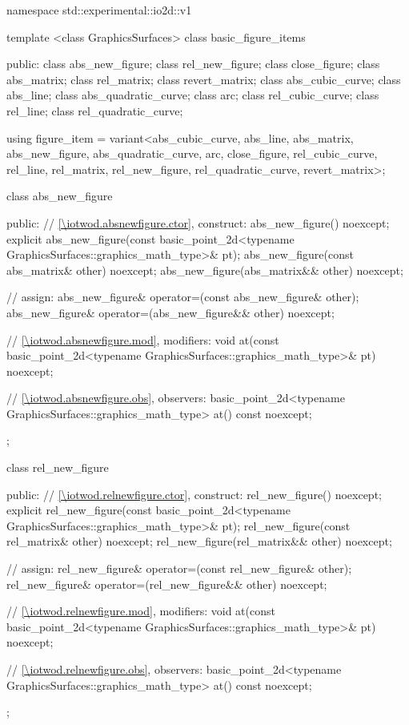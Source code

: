 \begin{codeblock}
namespace std::experimental::io2d::v1 {
  template <class GraphicsSurfaces>
  class basic_figure_items {
  public:
    class abs_new_figure;
    class rel_new_figure;
    class close_figure;
    class abs_matrix;
    class rel_matrix;
    class revert_matrix;
    class abs_cubic_curve;
    class abs_line;
    class abs_quadratic_curve;
    class arc;
    class rel_cubic_curve;
    class rel_line;
    class rel_quadratic_curve;

    using figure_item = variant<abs_cubic_curve, abs_line, abs_matrix,
      abs_new_figure, abs_quadratic_curve, arc, close_figure, rel_cubic_curve, 
      rel_line, rel_matrix, rel_new_figure, rel_quadratic_curve, revert_matrix>;

    class abs_new_figure {
    public:
      // \ref{\iotwod.absnewfigure.ctor}, construct:
      abs_new_figure() noexcept;
      explicit abs_new_figure(const basic_point_2d<typename
        GraphicsSurfaces::graphics_math_type>& pt);
      abs_new_figure(const abs_matrix& other) noexcept;
      abs_new_figure(abs_matrix&& other) noexcept;

      // assign:
      abs_new_figure& operator=(const abs_new_figure& other);
      abs_new_figure& operator=(abs_new_figure&& other) noexcept;
	
      // \ref{\iotwod.absnewfigure.mod}, modifiers:
      void at(const basic_point_2d<typename
        GraphicsSurfaces::graphics_math_type>& pt) noexcept;
	
      // \ref{\iotwod.absnewfigure.obs}, observers:
      basic_point_2d<typename
        GraphicsSurfaces::graphics_math_type> at() const noexcept;
    };

    class rel_new_figure {
    public:
      // \ref{\iotwod.relnewfigure.ctor}, construct:
      rel_new_figure() noexcept;
      explicit rel_new_figure(const basic_point_2d<typename
        GraphicsSurfaces::graphics_math_type>& pt);
      rel_new_figure(const rel_matrix& other) noexcept;
      rel_new_figure(rel_matrix&& other) noexcept;

      // assign:
      rel_new_figure& operator=(const rel_new_figure& other);
      rel_new_figure& operator=(rel_new_figure&& other) noexcept;
	
      // \ref{\iotwod.relnewfigure.mod}, modifiers:
      void at(const basic_point_2d<typename
        GraphicsSurfaces::graphics_math_type>& pt) noexcept;
	
      // \ref{\iotwod.relnewfigure.obs}, observers:
      basic_point_2d<typename
        GraphicsSurfaces::graphics_math_type> at() const noexcept;
    };

}}
\end{codeblock}
